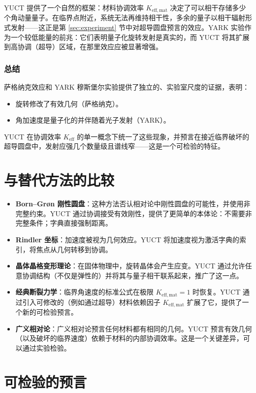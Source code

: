 \documentclass[12pt,a4paper]{article}
\begin{document}
	YUCT 提供了一个自然的框架：材料协调效率 \(K_{\mathrm{eff,mat}}\) 决定了可以相干存储多少个角动量量子。在临界点附近，系统无法再维持相干性，多余的量子以相干辐射形式发射——这正是第 \ref{sec:experiment} 节中对超导圆盘预言的效应。YARK 实验作为一个较低能量的前兆：它们表明量子化旋转发射是真实的，而 YUCT 将其扩展到高协调（超导）区域，在那里效应应被显著增强。
	
	\subsubsection{总结}
	
	萨格纳克效应和 YARK 穆斯堡尔实验提供了独立的、实验室尺度的证据，表明：
	\begin{itemize}
		\item 旋转修改了有效几何（萨格纳克）。
		\item 角加速度是量子化的并伴随着光子发射（YARK）。
	\end{itemize}
	YUCT 在协调效率 \(K_{\mathrm{eff}}\) 的单一概念下统一了这些现象，并预言在接近临界破坏的超导圆盘中，发射应强几个数量级且谱线窄——这是一个可检验的特征。
	
	\section{与替代方法的比较}
	\label{sec:comparison}
	
	\begin{itemize}
		\item \textbf{Born–Gr{\o}n 刚性圆盘}：这种方法否认相对论中刚性圆盘的可能性，并使用非完整约束。YUCT 通过协调接受有效刚性，提供了更简单的本体论：不需要非完整条件；字典直接强制距离。
		\item \textbf{Rindler 坐标}：加速度被视为几何效应。YUCT 将加速度视为激活字典的索引，将焦点从几何转移到协调。
		\item \textbf{晶体晶格变形理论}：在固体物理中，旋转晶体会产生应变。YUCT 通过允许任意协调结构（不仅是弹性的）并将其与量子相干联系起来，推广了这一点。
		\item \textbf{经典断裂力学}：临界角速度的标准公式在极限 \(K_{\mathrm{eff,mat}} = 1\) 时恢复。YUCT 通过引入可修改的（例如通过超导）材料依赖因子 \(K_{\mathrm{eff,mat}}\) 扩展了它，提供了一个新的可检验预言。
		\item \textbf{广义相对论}：广义相对论预言任何材料都有相同的几何。YUCT 预言有效几何（以及破坏的临界速度）依赖于材料的内部协调效率。这是一个关键差异，可以通过实验检验。
	\end{itemize}
	
	\section{可检验的预言}
	\label{sec:predict}
	
\end{document}
